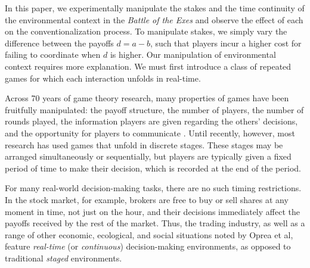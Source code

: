 \documentclass[10pt,letterpaper]{article}
\begin{document}

In this paper, we experimentally manipulate the stakes and the time continuity of the environmental context in the \emph{Battle of the Exes} and observe the effect of each on the conventionalization process. To manipulate stakes, we simply vary the difference between the payoffs $d = a - b$, such that players incur a higher cost for failing to coordinate when $d$ is higher. Our manipulation of environmental context requires more explanation. We must first introduce a class of repeated games for which each interaction unfolds in real-time.

Across 70 years of game theory research, many properties of games have been fruitfully manipulated: the payoff structure, the number of players, the number of rounds played, the information players are given regarding the others' decisions, and the opportunity for players to communicate \cite{VonNeumannMorgenstern07_TheoryOfGames, Kreps90, Rasmusen06}. Until recently, however, most research has used games that unfold in discrete stages. These stages may be arranged simultaneously or sequentially, but players are typically given a fixed period of time to make their decision, which is recorded at the end of the period. 

For many real-world decision-making tasks, there are no such timing restrictions. In the stock market, for example, brokers are free to buy or sell shares at any moment in time, not just on the hour, and their decisions immediately affect the payoffs received by the rest of the market. Thus, the trading industry, as well as a range of other economic, ecological, and social situations noted by  Oprea et al\cite{OpreaCharnessFriedman14_ContinuousTime}, feature \emph{real-time} (or \emph{continuous}) decision-making environments, as opposed to traditional \emph{staged} environments. 
\end{document}
